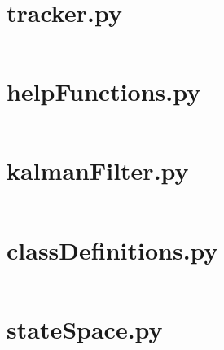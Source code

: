 
\begin{appendices}
	\section*{tracker.py}
	\inputminted[firstline=11,fontsize=\tiny, tabsize = 2, breaklines = true]{Python}{"../03Python/tomht/tracker.py"} 
	
	\section*{helpFunctions.py}
	\inputminted[firstline=2,fontsize=\tiny,tabsize = 2, breaklines = true]{Python}{"../03Python/tomht/helpFunctions/helpFunctions.py"}

	\section*{kalmanFilter.py}
	\inputminted[firstline=2,fontsize=\tiny,tabsize = 2, breaklines = true]{Python}{"../03Python/tomht/kalmanFilter/kalmanFilter.py"}

	\section*{classDefinitions.py}
	\inputminted[firstline=2,fontsize=\tiny,tabsize = 2, breaklines = true]{Python}{"../03Python/tomht/classDefinitions/classDefinitions.py"}

	\section*{stateSpace.py}
	\inputminted[firstline=2,fontsize=\tiny,tabsize = 2, breaklines = true]{Python}{"../03Python/tomht/stateSpace/pv/pv.py"}

\end{appendices}